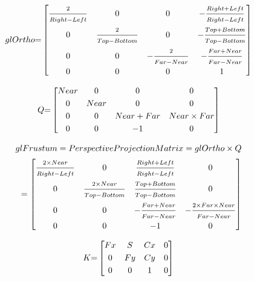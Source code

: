 {
	\setlength\arraycolsep{.15em}
	\scriptsize

	\begin{equation}\label{eq:glOrtho}
		glOrtho{=}
		\begin{bmatrix}
			\vfrac{2}{Right - Left} & 0 & 0 & -\vfrac{Right + Left}{Right - Left} \\[\smallskipamount]
			0 & \vfrac{2}{Top - Bottom} & 0 & -\vfrac{Top + Bottom}{Top - Bottom} \\[\smallskipamount]
			0 & 0 & -\vfrac{2}{Far - Near} & -\vfrac{Far + Near}{Far - Near} \\[\smallskipamount]
			0 & 0 & 0 & 1
		\end{bmatrix}
	\end{equation}

	\begin{equation}\label{eq:Q}
		Q{=}
		\begin{bmatrix}
			Near & 0 & 0 & 0 \\[\smallskipamount]
			0 & Near & 0 & 0 \\[\smallskipamount]
			0 & 0 & Near + Far & Near \times Far \\[\smallskipamount]
			0 & 0 & -1 & 0
		\end{bmatrix}
	\end{equation}

	\begin{equation}\label{eq:glFrustum}
		\begin{split}
			glFrustum = PerspectiveProjectionMatrix = glOrtho \times Q
			\\=
			\begin{bmatrix}
				\vfrac{2 \times Near}{Right - Left} & 0 & \vfrac{Right + Left}{Right - Left} & 0 \\[\smallskipamount]
				0 & \vfrac{2 \times Near}{Top - Bottom} & \vfrac{Top + Bottom}{Top - Bottom} & 0 \\[\smallskipamount]
				0 & 0 & -\vfrac{Far + Near}{Far - Near} & -\vfrac{2 \times Far \times Near}{Far - Near} \\[\smallskipamount]
				0 & 0 & -1 & 0
			\end{bmatrix}
		\end{split}
	\end{equation}

	\begin{equation}\label{eq:k}
		K{=}
		\begin{bmatrix}
			Fx & S & Cx & 0 \\[\smallskipamount]
			0 & Fy & Cy & 0 \\[\smallskipamount]
			0 & 0 & 1 & 0
		\end{bmatrix}
	\end{equation}
	
}
